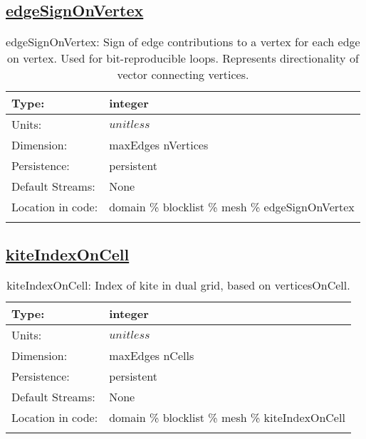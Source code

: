 \subsection[edgeSignOnVertex]{\hyperref[sec:var_tab_mesh]{edgeSignOnVertex}}
\label{subsec:var_sec_mesh_edgeSignOnVertex}
\begin{center}
\begin{longtable}{| p{2.0in} | p{4.0in} |}
        \hline 
        Type: & integer \\
        \hline 
        Units: & $unitless$ \\
        \hline 
        Dimension: & maxEdges nVertices \\
        \hline 
        Persistence: & persistent \\
        \hline 
		 Default Streams: & None \\
        \hline 
		 Location in code: & domain \% blocklist \% mesh \% edgeSignOnVertex \\
		 \hline 
    \caption{edgeSignOnVertex: Sign of edge contributions to a vertex for each edge on vertex. Used for bit-reproducible loops. Represents directionality of vector connecting vertices.}
\end{longtable}
\end{center}
\subsection[kiteIndexOnCell]{\hyperref[sec:var_tab_mesh]{kiteIndexOnCell}}
\label{subsec:var_sec_mesh_kiteIndexOnCell}
\begin{center}
\begin{longtable}{| p{2.0in} | p{4.0in} |}
        \hline 
        Type: & integer \\
        \hline 
        Units: & $unitless$ \\
        \hline 
        Dimension: & maxEdges nCells \\
        \hline 
        Persistence: & persistent \\
        \hline 
		 Default Streams: & None \\
        \hline 
		 Location in code: & domain \% blocklist \% mesh \% kiteIndexOnCell \\
		 \hline 
    \caption{kiteIndexOnCell: Index of kite in dual grid, based on verticesOnCell.}
\end{longtable}
\end{center}
